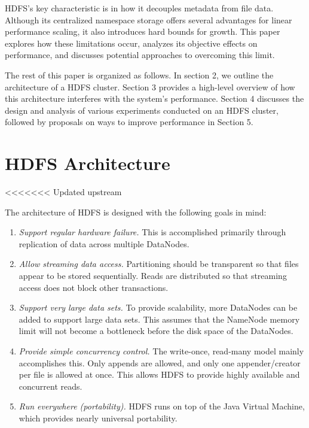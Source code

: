 \documentclass[11pt, a4paper]{article}
\begin{document}
\begin{multicols*}{2}
HDFS's key characteristic is in how it decouples metadata from file data. Although its centralized namespace storage offers several advantages for linear performance scaling, it also introduces hard bounds for growth. This paper explores how these limitations occur, analyzes its objective effects on performance, and discusses potential approaches to overcoming this limit.

The rest of this paper is organized as follows. In section 2, we outline the architecture of a HDFS cluster. Section 3 provides a high-level overview of how this architecture interferes with the system's performance. Section 4 discusses the design and analysis of various experiments conducted on an HDFS cluster, followed by proposals on ways to improve performance in Section 5.



\section{HDFS Architecture}


<<<<<<< Updated upstream

The architecture of HDFS is designed with the following goals in mind:
\begin{enumerate}[noitemsep, label=\arabic*.]
	\item\textit{Support regular hardware failure.} This is accomplished primarily through replication of data across multiple DataNodes.
	\item\textit{Allow streaming data access.} Partitioning should be transparent so that files appear to be stored sequentially. Reads are distributed so that streaming access does not block other transactions.
	\item\textit{Support very large data sets.} To provide scalability, more DataNodes can be added to support large data sets. This assumes that the NameNode memory limit will not become a bottleneck before the disk space of the DataNodes.
	\item\textit{Provide simple concurrency control.} The write-once, read-many model mainly accomplishes this. Only appends are allowed, and only one appender/creator per file is allowed at once. This allows HDFS to provide highly available and concurrent reads.
	\item\textit{Run everywhere (portability).} HDFS runs on top of the Java Virtual Machine, which provides nearly universal portability.
\end{enumerate}



\end{multicols*}
\end{document}
